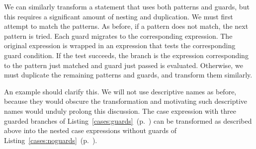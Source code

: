 We can similarly transform a  statement that uses both patterns and guards, but this requires a significant amount of nesting and duplication. We must first attempt to match the patterns. As before, if a pattern does not match, the next pattern is tried. Each guard migrates to the corresponding expression. The original expression is wrapped in an  expression that tests the corresponding guard condition. If the test succeeds, the  branch is the expression corresponding to the pattern just matched and guard just passed is evaluated. Otherwise, we must duplicate the remaining patterns and guards, and transform them similarly.

An example should clarify this. We will not use descriptive names as before, because they would obscure the transformation and motivating such descriptive names would unduly prolong this discussion. The case expression with three guarded branches of Listing~\ref{cases:guards}~(p.~\pageref{cases:guards}) can be transformed as described above into the nested case expressions without guards of Listing~\ref{cases:noguards}~(p.~\pageref{cases:noguards}).

